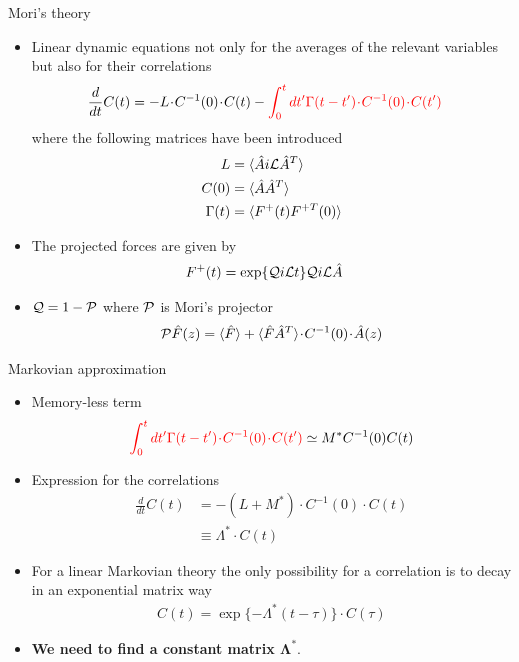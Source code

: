 \documentclass{beamer}
\newcommand{\esc}{\!\cdot\!}
\begin{document}
\begin{frame}{Mori's theory}
  \begin{itemize}
    \item<1-> Linear dynamic equations not only for the averages of the relevant variables but also for their correlations
\begin{align}
  \frac{d}{dt}C(t)&=-L\esc C^{-1}(0)\esc C(t)
  -{\color{red}\int_0^tdt' \Gamma(t-t')\esc C^{-1}(0)\esc  C(t')}
\nonumber
\end{align}
where the following matrices have been introduced
\begin{align}
  L&=\langle \hat{A}i{\cal L}\hat{A}^T\rangle \nonumber \\
  C(0)&=\langle \hat{A}\hat{A}^T\rangle \nonumber \\
\Gamma(t)&=\langle F^+(t)F^{+T}(0)\rangle
\nonumber
\end{align}
\item<2-> The projected forces are given by
\begin{align}
F^+(t)&= \exp\{{\cal Q}i{\cal L}t\} {\cal Q}i{\cal L}\hat{A}  
\nonumber
\end{align}
\item<3-> ${\cal Q}=1-{\cal P}$ where  ${\cal P}$  is Mori's  projector 
\begin{align}
  {\cal P}\hat{F}(z) = \langle \hat{F}\rangle+ \langle \hat{F}\hat{A}^T \rangle\esc  C^{-1}(0)\esc  \hat{A}(z)
\nonumber
\end{align}
\end{itemize}
\end{frame}

\begin{frame}{Markovian approximation}
  \begin{itemize}
    \item Memory-less term 
  \begin{align}
{\color{red}\int_0^tdt' \Gamma(t-t')\esc C^{-1}(0)\esc  C(t')} \simeq M^* C^{-1}(0)C(t)
\nonumber
\end{align}
\item Expression for the correlations
\begin{align}
  \frac{d}{dt}C(t) &= - (L+M^*)\esc C^{-1}(0)\esc C(t) \nonumber \\
                     &\equiv \Lambda^*\esc C(t)
  \nonumber
\end{align}
\item For a linear Markovian theory the only possibility for a correlation is to decay in an exponential matrix way
\begin{align}
  C(t)=\exp\{-\Lambda^* (t-\tau)\}\esc C(\tau)
\nonumber
\end{align}
\item {\bf We need to find a constant matrix $\boldsymbol{\Lambda^*}$}.
\end{itemize}
\end{frame}
\end{document}
